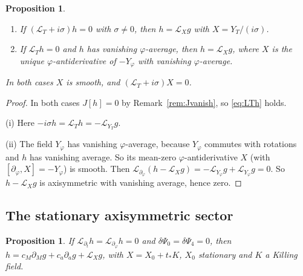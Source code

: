\documentclass[11pt]{amsart}
\newtheorem{proposition}[theorem]{Proposition}
\theoremstyle{definition}
\theoremstyle{remark}
\numberwithin{equation}{section}
\newcommand{\cL}{\mathcal{L}}
\begin{document}
\begin{proposition}\label{prop:puregauge}
\begin{enumerate}[label=(\roman*)]
\item If $(\cL_T+i\sigma)h=0$ with $\sigma\ne0$, then $h=\cL_Xg$ with $X=Y_T/(i\sigma)$.
\item If $\cL_Th=0$ and $h$ has vanishing $\varphi$-average, then $h=\cL_Xg$, where $X$ is the unique
$\varphi$-antiderivative of $-Y_\varphi$ with vanishing $\varphi$-average.
\end{enumerate}
In both cases $X$ is smooth, and $(\cL_T+i\sigma)X=0$.
\end{proposition}

\begin{proof}
In both cases $J[h]=0$ by Remark~\ref{rem:Jvanish}, so \eqref{eq:LTh} holds.

(i) Here $-i\sigma h=\cL_Th=-\cL_{Y_T}g$.

(ii) The field $Y_\varphi$ has vanishing $\varphi$-average, because $Y_\varphi$ commutes with rotations and $h$ has
vanishing average. So its mean-zero $\varphi$-antiderivative $X$ (with $[\partial_\varphi,X]=-Y_\varphi$) is smooth.
Then $\cL_{\partial_\varphi}(h-\cL_Xg)=-\cL_{Y_\varphi}g+\cL_{Y_\varphi}g=0$. So $h-\cL_Xg$ is axisymmetric with
vanishing average, hence zero.
\end{proof}

\subsection{The stationary axisymmetric sector}
\begin{proposition}\label{prop:stationary}
If $\cL_{\partial_t}h=\cL_{\partial_\varphi}h=0$ and $\delta\Psi_0=\delta\Psi_4=0$, then
$h=c_M\partial_Mg+c_a\partial_ag+\cL_Xg$, with $X=X_0+t_*K$, $X_0$ stationary and $K$ a Killing field.
\end{proposition}
\end{document}
